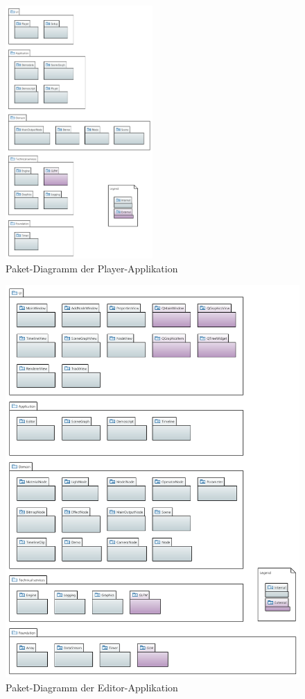 \begin{figure}[H]
    \centering
    \includegraphics[width=0.5\textwidth]{img/player_package_diagram.png}
    \caption{Paket-Diagramm der
        Player-Applikation\protect\footnotemark}\label{fig:package-diagram:player}
\end{figure}

\begin{figure}[H]
    \centering
    \includegraphics[width=1.0\textwidth]{img/editor_package_diagram.png}
    \caption{Paket-Diagramm der
        Editor-Applikation\protect\footnotemark}\label{fig:package-diagram:editor}
\end{figure}
